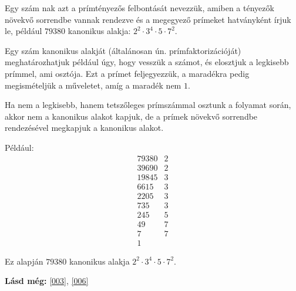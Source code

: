 \begin{defin2}
Egy szám nak azt a prímtényezős felbontását
nevezzük, amiben a tényezők növekvő sorrendbe vannak rendezve és a megegyező
prímeket hatványként írjuk le, például $79380$ kanonikus alakja:
$2^2 \cdot 3^4 \cdot 5 \cdot 7^2$.
\end{defin2}

\begin{method2}
Egy szám kanonikus alakját (általánosan ún. prímfaktorizációját)
meghatározhatjuk például úgy, hogy vesszük a számot, és elosztjuk a legkisebb
prímmel, ami osztója. Ezt a prímet feljegyezzük, a maradékra pedig
megismételjük a műveletet, amíg a maradék nem $1$.

Ha nem a legkisebb, hanem tetszőleges prímszámmal osztunk a folyamat során,
akkor nem a kanonikus alakot kapjuk, de a prímek növekvő sorrendbe rendezésével
megkapjuk a kanonikus alakot.

Például:
\[
\begin{array}{r|l}
  79380 & 2 \\
  39690 & 2 \\
  19845 & 3 \\
  6615 & 3 \\
  2205 & 3 \\
  735 & 3 \\
  245 & 5 \\
  49 & 7 \\
  7 & 7 \\
  1 &
\end{array}
\]

Ez alapján $79380$ kanonikus alakja $2^2 \cdot 3^4 \cdot 5 \cdot 7^2$.
\end{method2}

\textbf{Lásd még:} \ref{003}, \ref{006}
